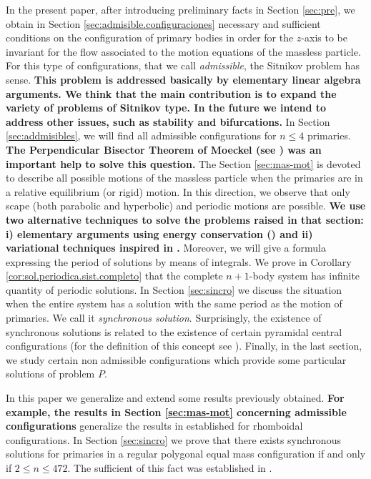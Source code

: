 \documentclass[smallcondensed]{svjour3}
\begin{document}
In the present paper, after introducing preliminary facts in Section \ref{sec:pre},   we
obtain in Section \ref{sec:admisible.configuraciones} necessary and sufficient conditions on the configuration of primary bodies in order for the $z$-axis to be invariant for the flow associated to the motion equations of the massless particle. For this type of configurations, that we call \emph{admissible}, the Sitnikov problem has sense. \textbf{This problem is addressed basically by elementary linear algebra arguments. We think that the main contribution is to expand the variety of problems of Sitnikov type. In the future we intend to address other issues, such as stability and bifurcations. }  In Section \ref{sec:addmisibles}, we will find all admissible configurations for $n\leq 4$ primaries. \textbf{The Perpendicular Bisector Theorem of Moeckel (see \cite{moeckel1990central}) was an important help to solve this question.} The Section \ref{sec:mas-mot} is devoted to describe all possible motions of the massless particle when the primaries are in a relative equilibrium (or rigid) motion.  In this direction, we observe that only scape (both parabolic and hyperbolic) and periodic motions are possible. \textbf{We use two alternative techniques to solve the problems raised in that section: i) elementary arguments using energy conservation (\cite[Ch. 2]{A}) and ii) variational techniques inspired in \cite{li2013characterization,David-2004,zhao2015nonplanar}.} Moreover, we will give a formula expressing the period of solutions  by means of integrals.  We prove in Corollary \ref{cor:sol.periodica.sist.completo} that the complete $n+1$-body system has  infinite quantity of periodic solutions.  In Section  \ref{sec:sincro} we
discuss the
situation when the entire system has a solution with the same period as the motion of primaries. We call it \emph{synchronous solution}. Surprisingly, the existence of synchronous solutions is related to the existence of certain pyramidal central configurations (for the definition of this concept see \cite{fayccal1996classification,faycaltesis,ouyang2004pyramidal}). Finally, in the last section, we study certain non admissible configurations which provide some particular solutions of problem $P$.

In this paper we generalize and extend some results previously obtained. \textbf{For example, the results in Section \ref{sec:mas-mot} concerning  admissible configurations}  generalize the results  in \cite{marchesin2013spatial} established for rhomboidal configurations. In Section \ref{sec:sincro} we prove that there exists synchronous solutions for primaries in a regular polygonal equal mass configuration if and only if $2\leq n\leq 472$. The sufficient of this fact was established in \cite{li2013characterization}.
\end{document}
